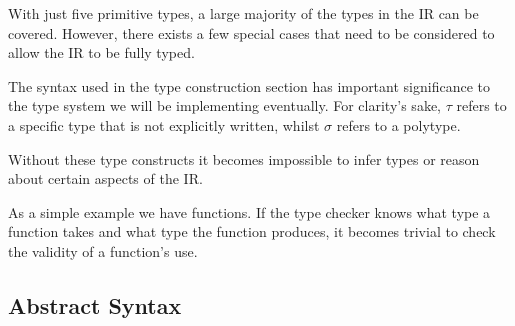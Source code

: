 \documentclass{l4proj}
\begin{document}
With just five primitive types, a large majority of the types in the IR can be covered.
However, there exists a few special cases that need to be considered to allow the IR to be fully typed.

The syntax used in the type construction section has important significance to the type system we will be implementing eventually.
For clarity's sake, $\tau$ refers to a specific type that is not explicitly written, whilst $\sigma$ refers to a polytype. 

Without these type constructs it becomes impossible to infer types or reason about certain aspects of the IR.

As a simple example we have functions.
If the type checker knows what type a function takes and what type the function produces, it becomes trivial to check the validity of a function's use.


\subsection{Abstract Syntax}
\end{document}
